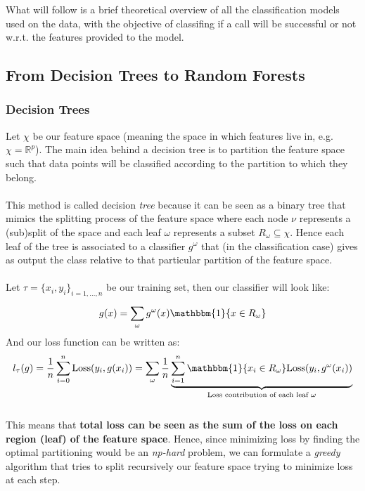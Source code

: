 What will follow is a brief theoretical overview of all the classification models used on the data, with the objective of classifing if a call will be successful or not w.r.t. the features provided to the model.

\subsection{From Decision Trees to Random Forests}
\subsubsection*{Decision Trees}
Let \(\chi\) be our feature space (meaning the space in which features live in, e.g. \(\chi = \mathbb{R}^p\)). The main idea behind a decision tree is to partition the feature space such that data points will be classified according to the partition to which they belong. \\
\\
This method is called decision \textit{tree} because it can be seen as a binary tree that mimics the splitting process of the feature space where each node \(\nu\) represents a (sub)split of the space and each leaf \(\omega\) represents a subset \(R_\omega \subseteq \chi\). Hence each leaf of the tree is associated to a classifier \(g^\omega\) that (in the classification case) gives as output the class relative to that particular partition of the feature space.
\\
\\
Let \(\tau = \{x_i, y_i \}_{i = 1, \dots ,n}\) be our training set, then our classifier will look like:
\begin{equation}
    g(x) =  \sum \limits_{\omega}^{} g^\omega(x)\mathbbm{1}\{x \in R_\omega\}
\end{equation}
And our loss function can be written as:
\begin{equation}
    l_\tau(g) = \frac{1}{n}  \sum \limits_{i= 0}^{n}\text{Loss}(y_i, g(x_i)) =  \sum \limits_{\omega}^{} \frac{1}{n} \underbrace{\sum \limits_{i=1}^{n} \mathbbm{1}\{x_i  \in R_\omega \} \text{Loss}(y_i, g^\omega(x_i))}_{\text{Loss contribution of each leaf }\omega}
\end{equation}
\\
This means that \textbf{total loss can be seen as the sum of the loss on each region (leaf) of the feature space}. Hence, since minimizing loss by finding the optimal partitioning would be an \textit{np-hard} problem, we can formulate a \textit{greedy} algorithm that tries to split recursively our feature space trying to minimize loss at each step.
